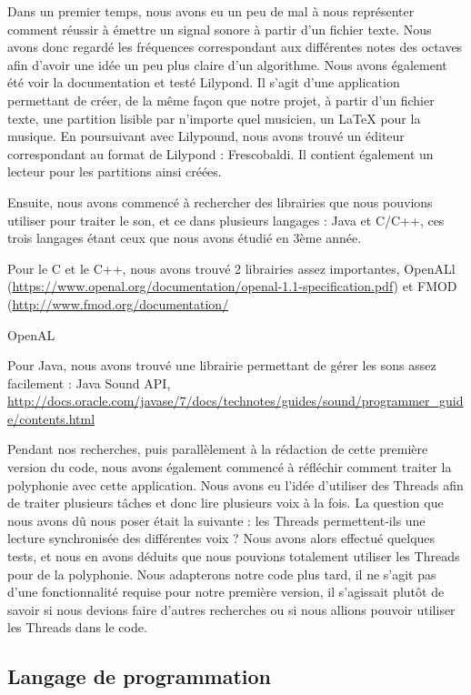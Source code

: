 \documentclass{EPUProjetPeiP}
\begin{document}
Dans un premier temps, nous avons eu un peu de mal à nous représenter comment réussir à émettre un signal sonore à partir d'un fichier texte. Nous avons donc regardé les fréquences correspondant aux différentes notes des octaves afin d'avoir une idée un peu plus claire d'un algorithme. Nous avons également été voir la documentation et testé Lilypond. Il s'agit d'une application permettant de créer, de la même façon que notre projet, à partir d'un fichier texte,  une partition lisible par n'importe quel musicien, un LaTeX pour la musique. En poursuivant avec Lilypound, nous avons trouvé un éditeur correspondant au format de Lilypond : Frescobaldi. Il contient également un lecteur pour les partitions ainsi créées.

Ensuite, nous avons commencé à rechercher des librairies que nous pouvions utiliser pour traiter le son, et ce dans plusieurs langages : Java et C/C++, ces trois langages étant ceux que nous avons étudié en 3ème année. 

Pour le C et le C++, nous avons trouvé 2 librairies assez importantes, OpenALl (\url{https://www.openal.org/documentation/openal-1.1-specification.pdf}) et FMOD (\url{http://www.fmod.org/documentation/}

OpenAL

Pour Java, nous avons trouvé une librairie permettant de gérer les sons assez facilement : Java Sound API, \url{http://docs.oracle.com/javase/7/docs/technotes/guides/sound/programmer_guide/contents.html}

Pendant nos recherches, puis parallèlement à la rédaction de cette première version du code, nous avons également commencé à réfléchir comment traiter la polyphonie avec cette application. Nous avons eu l'idée d'utiliser des Threads afin de traiter plusieurs tâches et donc lire plusieurs voix à la fois. La question que nous avons dû nous poser était la suivante : les Threads permettent-ils une lecture synchronisée des différentes voix ? Nous avons alors effectué quelques tests, et nous en avons déduits que nous pouvions totalement utiliser les Threads pour de la polyphonie. Nous adapterons notre code plus tard, il ne s'agit pas d'une fonctionnalité requise pour notre première version, il s'agissait plutôt de savoir si nous devions faire d'autres recherches ou si nous allions pouvoir utiliser les Threads dans le code.

\subsection{Langage de programmation} 
\end{document}
